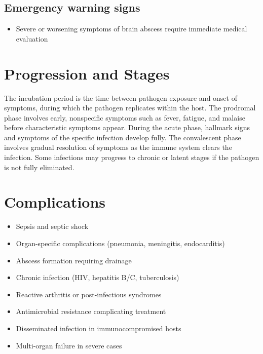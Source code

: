 \subsection{Emergency warning signs}
\begin{itemize}[noitemsep]
  \item Severe or worsening symptoms of brain abscess require immediate medical evaluation
\end{itemize}
\section{Progression and Stages}
The incubation period is the time between pathogen exposure and onset of symptoms, during which the pathogen replicates within the host. The prodromal phase involves early, nonspecific symptoms such as fever, fatigue, and malaise before characteristic symptoms appear. During the acute phase, hallmark signs and symptoms of the specific infection develop fully. The convalescent phase involves gradual resolution of symptoms as the immune system clears the infection. Some infections may progress to chronic or latent stages if the pathogen is not fully eliminated.
\section{Complications}
\begin{itemize}[noitemsep]
  \item Sepsis and septic shock
  \item Organ-specific complications (pneumonia, meningitis, endocarditis)
  \item Abscess formation requiring drainage
  \item Chronic infection (HIV, hepatitis B/C, tuberculosis)
  \item Reactive arthritis or post-infectious syndromes
  \item Antimicrobial resistance complicating treatment
  \item Disseminated infection in immunocompromised hosts
  \item Multi-organ failure in severe cases
\end{itemize}
